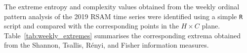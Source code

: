 \documentclass[12pt,a4paper]{article}
\newcommand{\figpathc}{../figures/tenmnts_analysis}
\begin{document}


The extreme entropy and complexity values obtained from the weekly ordinal pattern analysis of the 2019 RSAM time series were identified using a simple \texttt{R} script and compared with the corresponding points in the $H \times C$ plane. Table~\ref{tab:weekly_extremes} summarises the corresponding extrema obtained from the Shannon, Tsallis, R\'enyi, and Fisher information measures.
\end{document}
